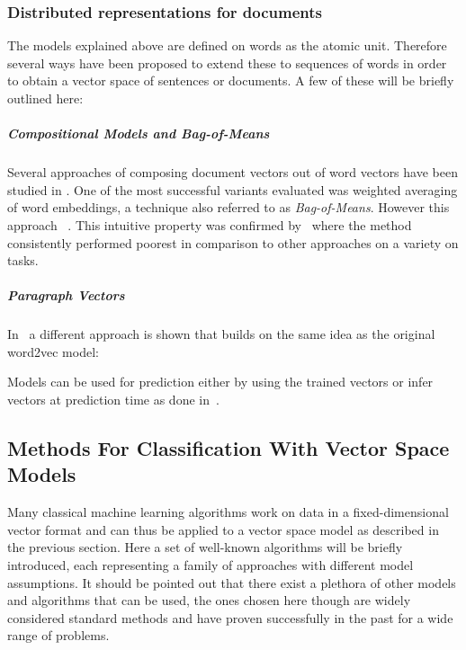 \subsubsection*{Distributed representations for documents}
\label{subs:Distributed representations for documents}

The models explained above are defined on words as the atomic unit. Therefore several ways have been proposed to extend these to sequences of words in order to obtain a vector space of sentences or documents. A few of these will be briefly outlined here:

\subparagraph{Compositional Models and Bag-of-Means}
\label{subp:Bag-of-Means}

Several approaches of composing document vectors out of word vectors have been studied in \cite{Mitchell:2010aa}. One of the most successful variants evaluated was weighted averaging of word embeddings, a technique also referred to as \emph{Bag-of-Means}. However this approach ~\cite{Le:2014aa}. This intuitive property was confirmed by~\cite{Zhang:2015aa} where the method consistently performed poorest in comparison to other approaches on a variety on tasks.

\subparagraph{Paragraph Vectors}
\label{subp:Paragraph Vectors}

In~\cite{Le:2014aa} a different approach is shown that builds on the same idea as the original word2vec model:

Models can be used for prediction either by using the trained vectors or infer vectors at prediction time as done in~\cite{Le:2014aa}.


\subsection{Methods For Classification With Vector Space Models}
\label{sub:Methods For Classification With Vector Space Models}

Many classical machine learning algorithms work on data in a fixed-dimensional vector format and can thus be applied to a vector space model as described in the previous section. Here a set of well-known algorithms will be briefly introduced, each representing a family of approaches with different model assumptions. It should be pointed out that there exist a plethora of other models and algorithms that can be used, the ones chosen here though are widely considered standard methods and have proven successfully in the past for a wide range of problems.

